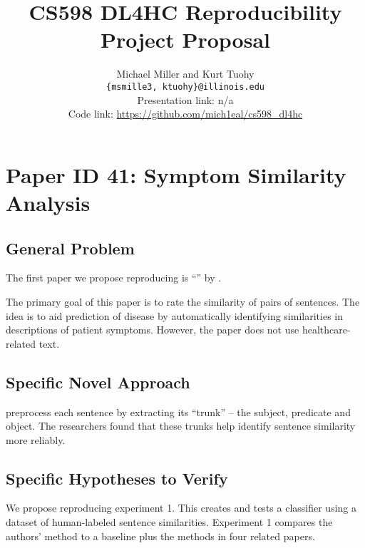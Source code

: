 \documentclass[11pt,a4paper]{article}
\title{CS598 DL4HC Reproducibility Project Proposal}
\author{Michael Miller and Kurt Tuohy \\
  \texttt{\{msmille3, ktuohy\}@illinois.edu}
  \\[2em]
  Presentation link: n/a\url{} \\
  Code link: \url{https://github.com/mich1eal/cs598_dl4hc}}
\begin{document}
\maketitle


\section{Paper ID 41: Symptom Similarity Analysis}
\subsection{General Problem}
The first paper we propose reproducing is ``'' by \citeauthor*{zhang_2019}.

The primary goal of this paper is to rate the similarity of pairs of sentences. The idea is to aid prediction of disease by automatically identifying similarities in descriptions of patient symptoms. However, the paper does not use healthcare-related text.

\subsection{Specific Novel Approach}
\citet{zhang_2019} preprocess each sentence by extracting its ``trunk'' -- the subject, predicate and object. The researchers found that these trunks help identify sentence similarity more reliably.

\subsection{Specific Hypotheses to Verify}
We propose reproducing experiment 1. This creates and tests a classifier using a dataset of human-labeled sentence similarities. Experiment 1 compares the authors' method to a baseline plus the methods in four related papers.
\end{document}
